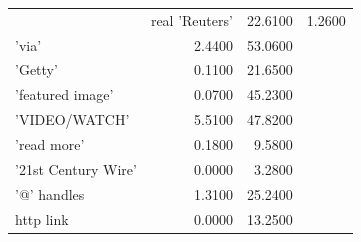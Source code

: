 \begin{tabular}{lrr}
\toprule
 & real %
\midrule
'Reuters' & 22.6100 & 1.2600 \\
'via' & 2.4400 & 53.0600 \\
'Getty' & 0.1100 & 21.6500 \\
'featured image' & 0.0700 & 45.2300 \\
'VIDEO/WATCH' & 5.5100 & 47.8200 \\
'read more' & 0.1800 & 9.5800 \\
'21st Century Wire' & 0.0000 & 3.2800 \\
'@' handles & 1.3100 & 25.2400 \\
http link & 0.0000 & 13.2500 \\
\bottomrule
\end{tabular}
